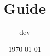 


\title{Guide}
\date{\today}
\author{dev}

\frontmatter
\maketitle
\tableofcontents

\mainmatter






\backmatter


